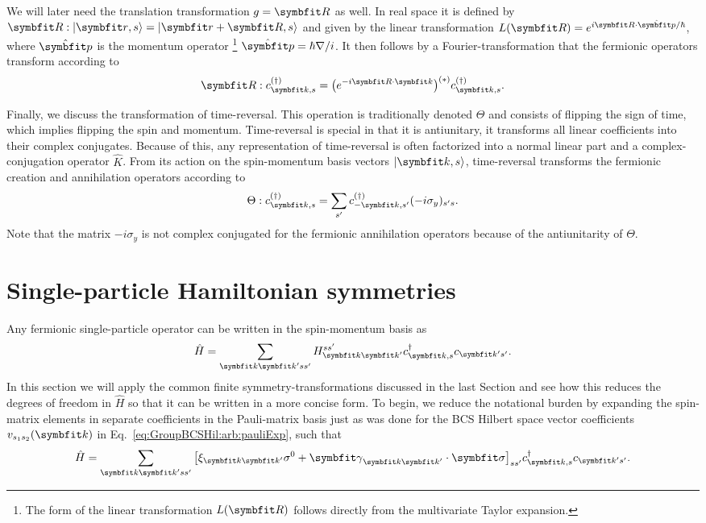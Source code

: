 We will later need the translation transformation $g=\v{R}$ as well. In real space it is defined by $\v{R}:\ket{\v{r},s} = \ket{\v{r}+\v{R},s}$
and given by the linear transformation $L(\v{R}) = e^{i\v{R}\cdot\hat{\v{p}}/\hbar}$, where $\hat{\v{p}}$ is the momentum operator%
\footnote{The form of the linear transformation $L(\v{R})$ follows directly from the multivariate Taylor expansion.} $\hat{\v{p}} = \hbar\nabla/i$.
It then follows by a Fourier-transformation that the fermionic operators transform according to
\begin{equation}
    \label{eq:Group:App:Ladder:translation}
    \v{R}:c^{(\dagger)}_{\v{k},s} = \big(e^{-i\v{R}\cdot\v{k}}\big)^{(\ast)}c^{(\dagger)}_{\v{k},s}.
\end{equation}

Finally, we discuss the transformation of time-reversal. This operation is traditionally denoted $\Theta$ and consists of flipping the sign of
time, which implies flipping the spin and momentum. Time-reversal is special in that it is antiunitary, \ie it transforms all linear coefficients
into their complex conjugates. Because of this, any representation of time-reversal is
often factorized into a normal linear part and a complex-conjugation operator $\hat{K}$. From its action on the
spin-momentum basis vectors $\ket{\v{k},s}$, time-reversal transforms the fermionic creation and annihilation operators according to
\begin{equation}
    \label{eq:Group:App:Ladder:timeReversal}
    \Theta:c^{(\dagger)}_{\v{k},s} = \sum_{s'}c^{(\dagger)}_{-\v{k},s'}(-i\sigma_y)_{s's}.
\end{equation}
Note that the matrix $-i\sigma_y$ is not complex conjugated for the fermionic annihilation operators because of the antiunitarity of $\Theta$.


\section{Single-particle Hamiltonian symmetries}

Any fermionic single-particle operator can be written in the spin-momentum basis as
\begin{equation}
    \label{eq:Group:Single:generalHamiltonian}
    \hat{H} = \sum_{\v{k}\v{k}'ss'}H^{ss'}_{\v{k}\v{k}'}c^{\dagger}_{\v{k},s}c_{\v{k}'s'}.
\end{equation}
In this section we will apply the common finite symmetry-transformations discussed in the last Section and see how this reduces the degrees
of freedom in $\hat{H}$ so that it can be written in a more concise form. To begin, we reduce the notational burden by expanding the spin-matrix
elements in separate coefficients in the Pauli-matrix basis just as was done for the BCS Hilbert space vector coefficients $v_{s_1s_2}(\v{k})$ in
Eq.~\eqref{eq:GroupBCSHil:arb:pauliExp}, such that
\begin{equation}
    \label{eq:Group:Single:pauliMatrices}
    \hat{H} = \sum_{\v{k}\v{k}'ss'}\big[\xi_{\v{k}\v{k}'}\sigma^0 + \v{\gamma}_{\v{k}\v{k}'}\cdot\v{\sigma}\big]_{ss'}c^{\dagger}_{\v{k},s}c_{\v{k}'s'}.
\end{equation}

